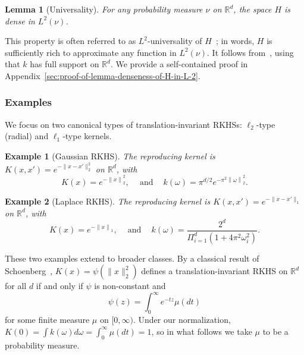 \documentclass[sn-mathphys-num]{sn-jnl}%
\numberwithin{equation}{section}
\newcommand{\redblock}[1]{{\color{black}#1}}
\newcommand{\R}{\mathbb{R}}
\newcommand{\kernel}{K}
\newcommand{\norm}[1]{\left\|{#1}\right\|} %
\newtheorem{lemma}{Lemma}
\newcommand{\profile}{\psi}
\theoremstyle{thmstyleone}%
\theoremstyle{thmstyletwo}%
\newtheorem{example}{Example}%
\theoremstyle{thmstylethree}%
\begin{document}
\redblock{
\begin{lemma}[Universality]
\label{lemma:denseness-of-H-in-L-2}
For any probability measure $\nu$ on $\R^d$, the space $H$ is dense in $L^2(\nu)$. 
\end{lemma} 
\vspace{.4em}

This property is often referred to as $L^2$-universality of $H$~\cite[Section 3]{SriperumbudurFuLa11}; in words, $H$ is sufficiently rich to approximate any function in $L^2(\nu)$. It follows from~\cite[Theorem 4.1, Proposition 5.6]{CarmeliDeToUm10}, using that $k$ has full support on $\R^d$. We provide a self-contained proof in Appendix~\ref{sec:proof-of-lemma-denseness-of-H-in-L-2}.
}




\subsubsection{Examples} 
We focus on two canonical types of translation-invariant RKHSs: $\ell_2$-type (radial) and $\ell_1$-type kernels.

\begin{example} [Gaussian RKHS]
The reproducing kernel is $\kernel(x,x') = e^{-\|x-x'\|_2^2}$ on $\R^d$, with
\begin{equation*}
	\kernel(x) = e^{-\norm{x}_2^2},\quad~\text{and}~\quad k(\omega) = \pi^{d/2} e^{- \pi^2 \norm{\omega}_2^2}.
\end{equation*} 
\end{example} 


\begin{example} [Laplace RKHS]
The reproducing kernel is $\kernel(x, x') = e^{-\|x-x'\|_1}$ on $\R^d$, with 
\begin{equation*}
	\kernel(x) = e^{-\norm{x}_1},\quad~\text{and}~\quad k(\omega) =  \frac{2^d}{\Pi_{i=1}^d (1+4\pi^2 \omega_i^2)}.
\end{equation*} 
\end{example} 

These two examples extend to broader classes. 
By a classical result of Schoenberg~\cite{Schoenberg38}, $\kernel(x)=\profile(\|x\|_2^2)$ defines 
a translation-invariant RKHS on $\R^d$ for all $d$ if and only if $\profile$ is non-constant and 
\begin{equation*}
	\profile(z) = \int_0^\infty e^{-tz} \mu(dt)
\end{equation*}
for some finite measure $\mu$ on $[0,\infty)$.
Under our normalization, $\kernel(0) = \int k(\omega) d\omega = \int_0^\infty \mu(dt) = 1$, so 
in what follows we take $\mu$ to be a probability measure. %
\end{document}
